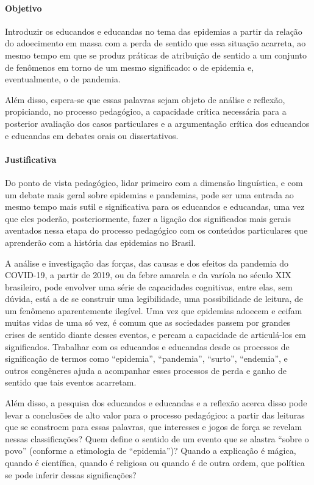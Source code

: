 \documentclass[12pt]{extarticle}
\begin{document}
\paragraph{Objetivo}

Introduzir os educandos e educandas no tema das epidemias a partir da
relação do adoecimento em massa com a perda de sentido que essa situação
acarreta, ao mesmo tempo em que se produz práticas de atribuição de
sentido a um conjunto de fenômenos em torno de um mesmo significado: o
de epidemia e, eventualmente, o de pandemia.

Além disso, espera-se que essas palavras sejam objeto de análise e
reflexão, propiciando, no processo pedagógico, a capacidade crítica
necessária para a posterior avaliação dos casos particulares e a
argumentação crítica dos educandos e educandas em debates orais ou
dissertativos.

\paragraph{Justificativa}

Do ponto de vista pedagógico, lidar primeiro com a dimensão linguística,
e com um debate mais geral sobre epidemias e pandemias, pode ser uma
entrada ao mesmo tempo mais sutil e significativa para os educandos e
educandas, uma vez que eles poderão, posteriormente, fazer a ligação dos
significados mais gerais aventados nessa etapa do processo pedagógico
com os conteúdos particulares que aprenderão com a história das
epidemias no Brasil.

A análise e investigação das forças, das causas e dos efeitos da
pandemia do COVID-19, a partir de 2019, ou da febre amarela e da varíola
no século XIX brasileiro, pode envolver uma série de capacidades
cognitivas, entre elas, sem dúvida, está a de se construir uma
legibilidade, uma possibilidade de leitura, de um fenômeno aparentemente
ilegível. Uma vez que epidemias adoecem e ceifam muitas vidas de uma só
vez, é comum que as sociedades passem por grandes crises de sentido
diante desses eventos, e percam a capacidade de articulá-los em
significados. Trabalhar com os educandos e educandas desde os processos
de significação de termos como ``epidemia'', ``pandemia'', ``surto'',
``endemia'', e outros congêneres ajuda a acompanhar esses processos de
perda e ganho de sentido que tais eventos acarretam.

Além disso, a pesquisa dos educandos e educandas e a reflexão acerca
disso pode levar a conclusões de alto valor para o processo pedagógico:
a partir das leituras que se constroem para essas palavras, que
interesses e jogos de força se revelam nessas classificações? Quem
define o sentido de um evento que se alastra ``sobre o povo'' (conforme
a etimologia de ``epidemia'')? Quando a explicação é mágica, quando é
científica, quando é religiosa ou quando é de outra ordem, que política
se pode inferir dessas significações?
\end{document}
